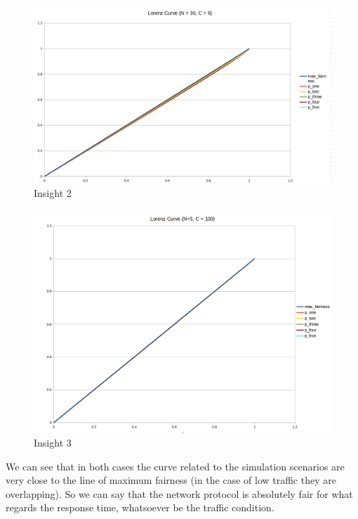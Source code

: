 \begin{figure}[H]
	\centering
	\includegraphics[width=\textwidth]{img/LorenzHighTraffic.png}
	\caption{Insight 2}
	\label{img: insight2_respTime}
\end{figure}
\begin{figure}[H]
	\centering
	\includegraphics[width=\textwidth]{img/LorenzLowTraffic.png}
	\caption{Insight 3}
	\label{img: insight3_respTime}
\end{figure}

\noindent We can see that in both cases the curve related to the simulation scenarios are very close to the line of maximum fairness (in the case of low traffic they are overlapping). So we can say that the network protocol is absolutely fair for what regards the response time, whatsoever be the traffic condition.

